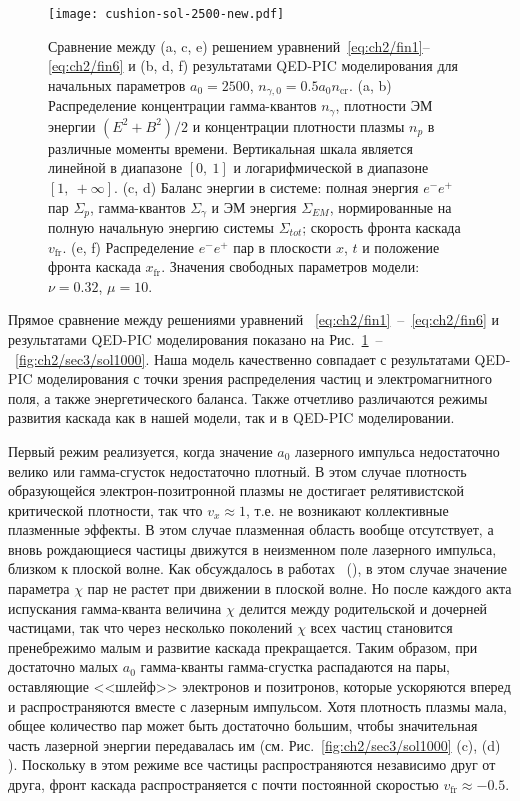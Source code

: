 \begin{figure}
    \texttt{[image: cushion-sol-2500-new.pdf]}
    \caption[Сравнение решения модельных уравнений, описывающий развитие КЭД каскада и результатов QED-PIC моделирования для начальных параметров $a_0=2500$, $n_{\gamma,0}=0.5 a_0 n_\mathrm{cr}$]{\label{fig:ch2/sec3/sol2500} 
    Сравнение между (a, c, e) решением уравнений~\eqref{eq:ch2/fin1}--\eqref{eq:ch2/fin6} и (b, d, f) результатами QED-PIC моделирования для начальных параметров $a_0=2500$, $n_{\gamma,0}=0.5 a_0 n_\mathrm{cr}$.
    (a, b) Распределение концентрации гамма-квантов $n_\gamma$, плотности ЭМ энергии $(E^2+B^2)/2$ и концентрации плотности плазмы $n_p$ в различные моменты времени.
    Вертикальная шкала является линейной в диапазоне $[0,\ 1]$ и логарифмической в диапазоне $[1,\ +\!\infty]$.
    (c, d) Баланс энергии в системе: полная энергия $e^-e^+$ пар $\Sigma_p$, гамма-квантов $\Sigma_\gamma$ и ЭМ энергия $\Sigma_{EM}$, нормированные на полную начальную энергию системы $\Sigma_{tot}$; скорость фронта каскада $v_\mathrm{fr}$.
    (e, f) Распределение $e^-e^+$ пар в плоскости $x$, $t$ и положение фронта каскада $x_\mathrm{fr}$. Значения свободных параметров модели: $\nu=0.32$, $\mu=10$.}
\end{figure}

Прямое сравнение между решениями уравнений ~\eqref{eq:ch2/fin1}~--~\eqref{eq:ch2/fin6} и результатами QED-PIC моделирования показано на Рис.~\ref{fig:ch2/sec3/sol2500}~--~\ref{fig:ch2/sec3/sol1000}.
Наша модель качественно совпадает с результатами QED-PIC моделирования с точки зрения распределения частиц и электромагнитного поля, а также энергетического баланса.
Также отчетливо различаются режимы развития каскада как в нашей модели, так и в QED-PIC моделировании.

Первый режим реализуется, когда значение $a_0$ лазерного импульса недостаточно велико или гамма-сгусток недостаточно плотный.
В этом случае плотность образующейся электрон-позитронной плазмы не достигает релятивистской критической плотности, так что $v_x\approx 1$, т.е. не возникают коллективные плазменные эффекты.
В этом случае плазменная область вообще отсутствует, а вновь рождающиеся частицы движутся в неизменном поле лазерного импульса, близком к плоской волне.
Как обсуждалось в работах~\cite{di2012extremely, bulanov2013electromagnetic, narozhny2015quantum, mironov2017observable} (), в этом случае значение параметра $\chi$ пар не растет при движении в плоской волне.
Но после каждого акта испускания гамма-кванта величина $\chi$ делится между родительской и дочерней частицами, так что через несколько поколений $\chi$ всех частиц становится пренебрежимо малым и развитие каскада прекращается.
Таким образом, при достаточно малых $a_0$ гамма-кванты гамма-сгустка распадаются на пары, оставляющие <<шлейф>> электронов и позитронов, которые ускоряются вперед и распространяются вместе с лазерным импульсом.
Хотя плотность плазмы мала, общее количество пар может быть достаточно большим, чтобы значительная часть лазерной энергии передавалась им (см. Рис.~\ref{fig:ch2/sec3/sol1000} (c), (d) ).
Поскольку в этом режиме все частицы распространяются независимо друг от друга, фронт каскада распространяется с почти постоянной скоростью $v_\mathrm{fr}\approx -0.5$.

